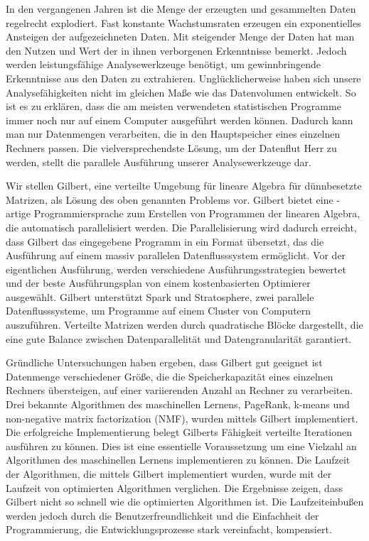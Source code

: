 \clearemptydoublepage
{}
{}	

\vspace*{2cm}
\begin{center}
\end{center}
\vspace{1cm}

In den vergangenen Jahren ist die Menge der erzeugten und gesammelten Daten regelrecht explodiert.
Fast konstante Wachstumsraten erzeugen ein exponentielles Ansteigen der aufgezeichneten Daten.
Mit steigender Menge der Daten hat man den Nutzen und Wert der in ihnen verborgenen Erkenntnisse bemerkt.
Jedoch werden leistungsfähige Analysewerkzeuge benötigt, um gewinnbringende Erkenntnisse aus den Daten zu extrahieren.
Unglücklicherweise haben sich unsere Analysefähigkeiten nicht im gleichen Maße wie das Datenvolumen entwickelt.
So ist es zu erklären, dass die am meisten verwendeten statistischen Programme immer noch nur auf einem Computer ausgeführt werden können.
Dadurch kann man nur Datenmengen verarbeiten, die in den Hauptspeicher eines einzelnen Rechners passen.
Die vielversprechendste Lösung, um der Datenflut Herr zu werden, stellt die parallele Ausführung unserer Analysewerkzeuge dar.

Wir stellen Gilbert, eine verteilte Umgebung für lineare Algebra für dünnbesetzte Matrizen, als Lösung des oben genannten Problems vor.
Gilbert bietet eine \matlab-artige Programmiersprache zum Erstellen von Programmen der linearen Algebra, die automatisch parallelisiert werden.
Die Parallelisierung wird dadurch erreicht, dass Gilbert das eingegebene Programm in ein Format übersetzt, das die Ausführung auf einem massiv parallelen Datenflusssystem ermöglicht.
Vor der eigentlichen Ausführung, werden verschiedene Ausführungsstrategien bewertet und der beste Ausführungsplan von einem kostenbasierten Optimierer ausgewählt.
Gilbert unterstützt Spark und Stratosphere, zwei parallele Datenflusssysteme, um Programme auf einem Cluster von Computern auszuführen.
Verteilte Matrizen werden durch quadratische Blöcke dargestellt, die eine gute Balance zwischen Datenparallelität und Datengranularität garantiert.

Gründliche Untersuchungen haben ergeben, dass Gilbert gut geeignet ist Datenmenge verschiedener Größe, die die Speicherkapazität eines einzelnen Rechners übersteigen, auf einer variierenden Anzahl an Rechner zu verarbeiten.
Drei bekannte Algorithmen des maschinellen Lernens, PageRank, k-means und non-negative matrix factorization (NMF), wurden mittels Gilbert implementiert.
Die erfolgreiche Implementierung belegt Gilberts Fähigkeit verteilte Iterationen ausführen zu können.
Dies ist eine essentielle Voraussetzung um eine Vielzahl an Algorithmen des maschinellen Lernens implementieren zu können.
Die Laufzeit der Algorithmen, die mittels Gilbert implementiert wurden, wurde mit der Laufzeit von optimierten Algorithmen verglichen.
Die Ergebnisse zeigen, dass Gilbert nicht so schnell wie die optimierten Algorithmen ist.
Die Laufzeiteinbußen werden jedoch durch die Benutzerfreundlichkeit und die Einfachheit der Programmierung, die Entwicklungsprozesse stark vereinfacht, kompensiert.